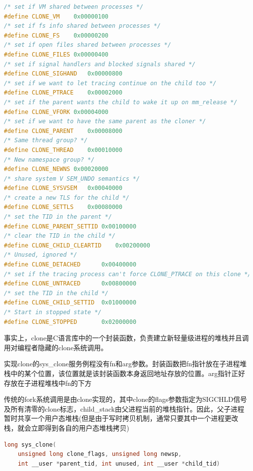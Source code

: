 \begin{lstlisting}[language=C++, caption={clone flags}]
/* set if VM shared between processes */
#define CLONE_VM	0x00000100	
/* set if fs info shared between processes */
#define CLONE_FS	0x00000200	
/* set if open files shared between processes */
#define CLONE_FILES	0x00000400	
/* set if signal handlers and blocked signals shared */
#define CLONE_SIGHAND	0x00000800	
/* set if we want to let tracing continue on the child too */
#define CLONE_PTRACE	0x00002000	
/* set if the parent wants the child to wake it up on mm_release */
#define CLONE_VFORK	0x00004000	
/* set if we want to have the same parent as the cloner */
#define CLONE_PARENT	0x00008000	
/* Same thread group? */
#define CLONE_THREAD	0x00010000	
/* New namespace group? */
#define CLONE_NEWNS	0x00020000	
/* share system V SEM_UNDO semantics */
#define CLONE_SYSVSEM	0x00040000	
/* create a new TLS for the child */
#define CLONE_SETTLS	0x00080000	
/* set the TID in the parent */
#define CLONE_PARENT_SETTID	0x00100000	
/* clear the TID in the child */
#define CLONE_CHILD_CLEARTID	0x00200000	
/* Unused, ignored */
#define CLONE_DETACHED		0x00400000	
/* set if the tracing process can't force CLONE_PTRACE on this clone */
#define CLONE_UNTRACED		0x00800000	
/* set the TID in the child */
#define CLONE_CHILD_SETTID	0x01000000	
/* Start in stopped state */
#define CLONE_STOPPED		0x02000000	
\end{lstlisting}

    事实上，clone是C语言库中的一个封装函数，负责建立新轻量级进程的堆栈并且调用对编程者隐藏的clone系统调用。

    实现clone的sys\_clone服务例程没有fn和arg参数。封装函数把fn指针放在子进程堆栈中的某个位置，该位置就是该封装函数本身返回地址存放的位置。arg指针正好存放在子进程堆栈中fn的下方

    传统的fork系统调用是由clone实现的，其中clone的flags参数指定为SIGCHLD信号及所有清零的clone标志，child\_stack由父进程当前的堆栈指针。因此，父子进程暂时共享一个用户态堆栈(但是由于写时拷贝机制，通常只要其中一个进程更改栈，就会立即得到各自的用户态堆栈拷贝)

\begin{lstlisting}[language=C++]
long sys_clone(
    unsigned long clone_flags, unsigned long newsp,
    int __user *parent_tid, int unused, int __user *child_tid)
\end{lstlisting}
